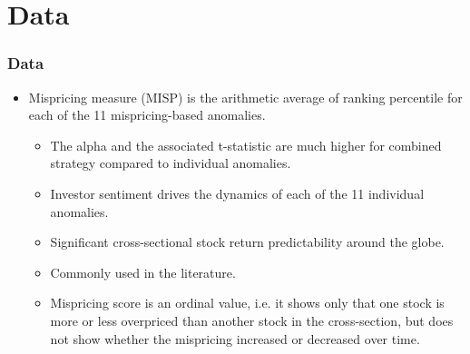 \documentclass{beamer}
\begin{document}
\section{Data}
\begin{frame}
	\frametitle{Data}

	\begin{itemize}
		\item Mispricing measure (MISP) is the arithmetic average of ranking percentile for each of the 11 mispricing-based anomalies. \citep{Stambaugh2015}
		\begin{itemize}
			\item The alpha and the associated t-statistic are much higher for combined strategy compared to individual anomalies.
			\item Investor sentiment drives the dynamics of each of the 11 individual anomalies. \citep{Stambaugh2012a}
			\item Significant cross-sectional stock return predictability around the globe. \citep{Jacobs2016}
			\item Commonly used in the literature.
			\item Mispricing score is an ordinal value, i.e. it shows only that one stock is more or less overpriced than another stock in the cross-section, but does not show whether the mispricing increased or decreased over time. 
		\end{itemize}	
	\end{itemize}
\end{frame}  
\end{document}
